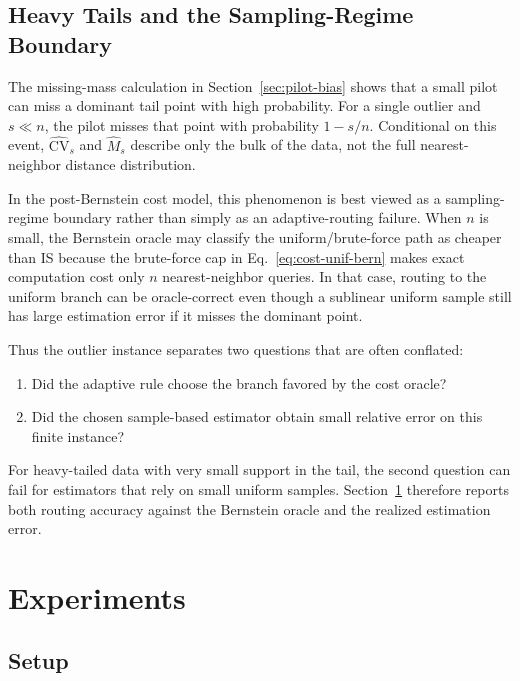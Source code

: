 \documentclass[conference]{IEEEtran}
\begin{document}
\subsection{Heavy Tails and the Sampling-Regime Boundary}
\label{sec:adaptive-failure}

The missing-mass calculation in Section~\ref{sec:pilot-bias} shows
that a small pilot can miss a dominant tail point with high probability.
For a single outlier and $s\ll n$, the pilot misses that point with
probability $1-s/n$. Conditional on this event,
$\widehat{\mathrm{CV}}_s$ and $\widehat{M}_s$ describe only the bulk of
the data, not the full nearest-neighbor distance distribution.

In the post-Bernstein cost model, this phenomenon is best viewed as a
sampling-regime boundary rather than simply as an adaptive-routing
failure. When $n$ is small, the Bernstein oracle may classify the
uniform/brute-force path as cheaper than IS because the brute-force cap
in Eq.~\ref{eq:cost-unif-bern} makes exact computation cost only $n$
nearest-neighbor queries. In that case, routing to the uniform branch
can be oracle-correct even though a sublinear uniform sample still has
large estimation error if it misses the dominant point.

Thus the outlier instance separates two questions that are often
conflated:
\begin{enumerate}
    \item Did the adaptive rule choose the branch favored by the cost
    oracle?
    \item Did the chosen sample-based estimator obtain small relative
    error on this finite instance?
\end{enumerate}
For heavy-tailed data with very small support in the tail, the second
question can fail for estimators that rely on small uniform samples. Section~\ref{sec:experiments}
therefore reports both routing accuracy against the Bernstein oracle
and the realized estimation error.

\section{Experiments}
\label{sec:experiments}

\subsection{Setup}
\end{document}
